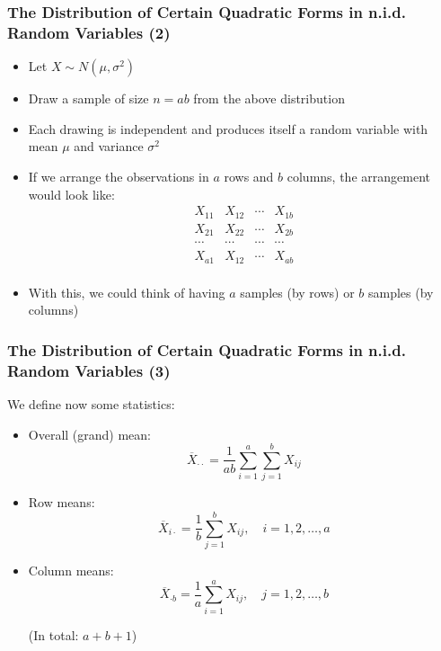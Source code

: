 \documentclass[10pt]{beamer}
\theoremstyle{definition}
\begin{document}
\begin{frame}[fragile]
\frametitle{The Distribution of Certain Quadratic Forms in n.i.d. Random Variables (2)}
\begin{itemize}
	\item Let $X\sim N(\mu, \sigma^{2})$
	\item Draw a sample of size $n = ab$ from the above distribution
	\item Each drawing is independent and produces itself a random variable with mean $\mu$ and variance $\sigma^{2}$
	\item If we arrange the observations in $a$ rows and $b$ columns, the arrangement would look like:
	\[
		\begin{matrix}
			X_{11} & X_{12} & \cdots & X_{1b}\\
			X_{21} & X_{22} & \cdots & X_{2b}\\
			\cdots & \cdots & \cdots & \cdots\\
			X_{a1} & X_{12} & \cdots & X_{ab}\\
		\end{matrix}			
	\]
	\item With this, we could think of having $a$ samples (by rows) or $b$ samples (by columns)
\end{itemize}
\end{frame}

\begin{frame}[fragile]
\frametitle{The Distribution of Certain Quadratic Forms in n.i.d. Random Variables (3)}
We define now some statistics:
\begin{itemize}
	\item Overall (grand) mean:
	\[
		\overline{X}_{\cdot\cdot} = \frac{1}{ab}\sum_{i=1}^{a}\sum_{j=1}^{b}X_{ij}
	\]
	\item Row means:
	\[
		\overline{X}_{i\cdot} = \frac{1}{b}\sum_{j=1}^{b}X_{ij},\quad i = 1,2,\ldots, a
	\]
	\item Column means:
	\[
		\overline{X}_{\cdot b} = \frac{1}{a} \sum_{i=1}^{a}X_{ij}, \quad j = 1,2,\ldots,b
	\]
	
	(In total: $a + b + 1$)
	
\end{itemize}
\end{frame}
\end{document}
